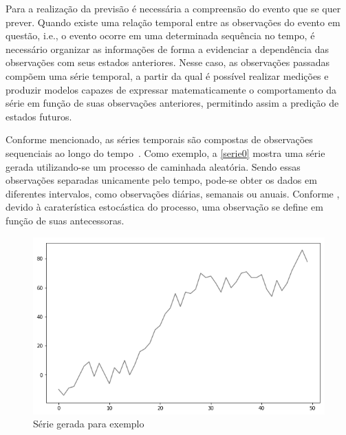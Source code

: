 \documentclass[
    12pt,
    oneside,
    a4paper,
    english,
    brazil
]{abntex2}
\begin{document}

Para a realização da previsão é necessária  a compreensão do evento que se quer
prever. Quando  existe uma relação temporal  entre as observações do  evento em
questão,  i.e., o  evento  ocorre  em uma  determinada  sequência  no tempo,  é
necessário organizar  as informações  de forma a  evidenciar a  dependência das
observações com  seus estados anteriores.  Nesse caso, as  observações passadas
compõem uma  série temporal, a  partir da qual  é possível realizar  medições e
produzir modelos capazes de expressar  matematicamente o comportamento da série
em  função de  suas  observações  anteriores, permitindo  assim  a predição  de
estados futuros.


Conforme  mencionado,   as  séries  temporais  são   compostas  de  observações
sequenciais ao  longo do  tempo~\cite{wiley}. Como exemplo,  a \autoref{serie0}
mostra uma série gerada utilizando-se um processo de caminhada aleatória. Sendo
essas observações  separadas unicamente pelo  tempo, pode-se obter os  dados em
diferentes intervalos, como observações diárias, semanais ou anuais.
Conforme ,  devido à caraterística estocástica  do processo,
uma observação se define em função de suas antecessoras.

\begin{figure}[ht]
    \centering
    \caption{Série gerada para exemplo}\label{serie0}
    \includegraphics[width=.6\linewidth]{images/serie_exemplo.png}
\end{figure}
\end{document}
